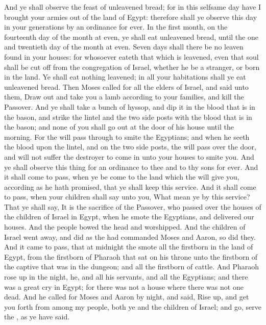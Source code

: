 \begin{biblechapter}
\verse And ye shall observe the feast of unleavened bread; for in this selfsame day have I brought your armies out of the land of Egypt: therefore shall ye observe this day in your generations by an ordinance for ever.
\verse In the first month, on the fourteenth day of the month at even, ye shall eat unleavened bread, until the one and twentieth day of the month at even.
\verse Seven days shall there be no leaven found in your houses: for whosoever eateth that which is leavened, even that soul shall be cut off from the congregation of Israel, whether he be a stranger, or born in the land.
\verse Ye shall eat nothing leavened; in all your habitations shall ye eat unleavened bread.
\verse Then Moses called for all the elders of Israel, and said unto them, Draw out and take you a lamb according to your families, and kill the Passover.
\verse And ye shall take a bunch of hyssop, and dip it in the blood that is in the bason, and strike the lintel and the two side posts with the blood that is in the bason; and none of you shall go out at the door of his house until the morning.
\verse For the \LORD will pass through to smite the Egyptians; and when he seeth the blood upon the lintel, and on the two side posts, the \LORD will pass over the door, and will not suffer the destroyer to come in unto your houses to smite you.
\verse And ye shall observe this thing for an ordinance to thee and to thy sons for ever.
\verse And it shall come to pass, when ye be come to the land which the \LORD will give you, according as he hath promised, that ye shall keep this service.
\verse And it shall come to pass, when your children shall say unto you, What mean ye by this service?
\verse That ye shall say, It is the sacrifice of the \LORDs Passover, who passed over the houses of the children of Israel in Egypt, when he smote the Egyptians, and delivered our houses. And the people bowed the head and worshipped.
\verse And the children of Israel went away, and did as the \LORD had commanded Moses and Aaron, so did they.
\verse And it came to pass, that at midnight the \LORD smote all the firstborn in the land of Egypt, from the firstborn of Pharaoh that sat on his throne unto the firstborn of the captive that was in the dungeon; and all the firstborn of cattle.
\verse And Pharaoh rose up in the night, he, and all his servants, and all the Egyptians; and there was a great cry in Egypt; for there was not a house where there was not one dead.
 And he called for Moses and Aaron by night, and said, Rise up, and get you forth from among my people, both ye and the children of Israel; and go, serve the \LORD, as ye have said.

\end{biblechapter}
